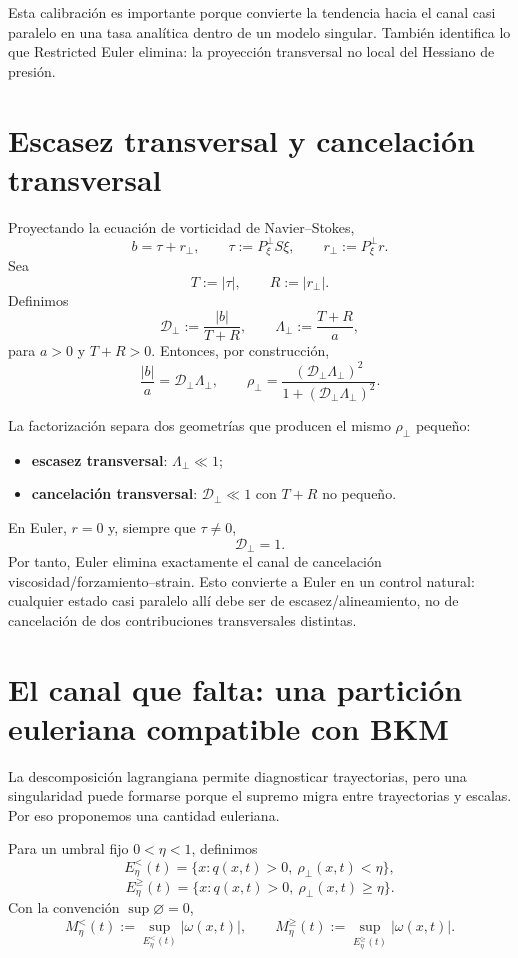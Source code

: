 \documentclass[11pt]{article}
\newcommand{\Pperp}{P_{\xi}^{\perp}}
\newcommand{\rhoT}{\rho_{\perp}}
\newcommand{\Dcal}{\mathcal D_{\perp}}
\newcommand{\Lcal}{\Lambda_{\perp}}
\begin{document}
Esta calibración es importante porque convierte la tendencia hacia el canal casi paralelo en una tasa analítica dentro de un modelo singular. También identifica lo que Restricted Euler elimina: la proyección transversal no local del Hessiano de presión.

\section{Escasez transversal y cancelación transversal}

Proyectando la ecuación de vorticidad de Navier--Stokes,
\[
b=\tau+r_\perp,
\qquad
\tau:=\Pperp S\xi,
\qquad
r_\perp:=\Pperp r.
\]
Sea
\[
T:=|\tau|,\qquad R:=|r_\perp|.
\]
Definimos
\[
\Dcal:=\frac{|b|}{T+R},
\qquad
\Lcal:=\frac{T+R}{a},
\]
para $a>0$ y $T+R>0$. Entonces, por construcción,
\[
\boxed{\frac{|b|}{a}=\Dcal\Lcal},
\qquad
\boxed{\rhoT=\frac{(\Dcal\Lcal)^2}{1+(\Dcal\Lcal)^2}}.
\]

La factorización separa dos geometrías que producen el mismo $\rhoT$ pequeño:
\begin{itemize}[leftmargin=1.5em]
\item \textbf{escasez transversal}: $\Lcal\ll1$;
\item \textbf{cancelación transversal}: $\Dcal\ll1$ con $T+R$ no pequeño.
\end{itemize}

En Euler, $r=0$ y, siempre que $\tau\neq0$,
\[
\Dcal=1.
\]
Por tanto, Euler elimina exactamente el canal de cancelación viscosidad/forzamiento--strain. Esto convierte a Euler en un control natural: cualquier estado casi paralelo allí debe ser de escasez/alineamiento, no de cancelación de dos contribuciones transversales distintas.

\section{El canal que falta: una partición euleriana compatible con BKM}

La descomposición lagrangiana permite diagnosticar trayectorias, pero una singularidad puede formarse porque el supremo migra entre trayectorias y escalas. Por eso proponemos una cantidad euleriana.

Para un umbral fijo $0<\eta<1$, definimos
\[
E_\eta^{<}(t)=\{x:q(x,t)>0,\ \rhoT(x,t)<\eta\},
\]
\[
E_\eta^{\ge}(t)=\{x:q(x,t)>0,\ \rhoT(x,t)\ge\eta\}.
\]
Con la convención $\sup\varnothing=0$,
\[
M_\eta^{<}(t):=\sup_{E_\eta^{<}(t)}|\omega(x,t)|,
\qquad
M_\eta^{\ge}(t):=\sup_{E_\eta^{\ge}(t)}|\omega(x,t)|.
\]
\end{document}
